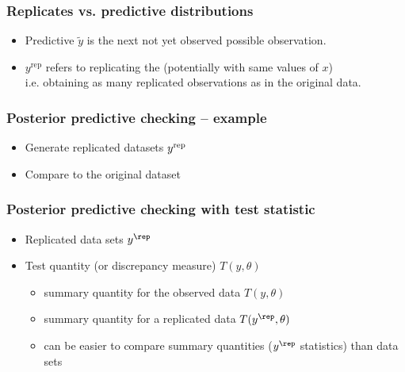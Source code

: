 \documentclass[10pt]{beamer}
\begin{document}
\begin{frame}

\frametitle{Replicates vs. predictive distributions}

  \begin{itemize}
  \item Predictive $\tilde{y}$ is the next not yet observed possible
    observation. \pause
    \item $y^{\mathrm{rep}}$ refers to replicating the  (potentially with same values of $x$)\\i.e. obtaining as
    many replicated observations as in the original data.
  \end{itemize}

\end{frame}


\begin{frame}[fragile]

\frametitle{Posterior predictive checking -- example}

  \begin{itemize}
  \item<1-> Generate replicated datasets $y^{\rm rep}$
  \item<2-> Compare to the original dataset
  \end{itemize}
  \vspace{-1\baselineskip}

\end{frame}


\begin{frame}

\frametitle{Posterior predictive checking with test statistic}

  \begin{itemize}
  \item Replicated data sets $y^{\rep}$
  \item Test quantity (or discrepancy measure) $T(y,\theta)$
    \begin{itemize}
    \item summary quantity for the observed data $T(y,\theta)$
    \item summary quantity for a replicated data $T(y^{\rep},\theta)$
    \item can be easier to compare summary quantities ($y^{\rep}$ statistics) than data sets
    \end{itemize}
  \end{itemize}

\end{frame}
\end{document}
